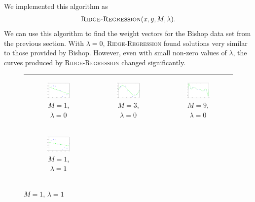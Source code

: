 \documentclass{sigchi}
\begin{document}
We implemented this algorithm as
\[\textsc{Ridge-Regression($x, y, M, \lambda$)}.\]
We can use this algorithm to find the weight vectors for the Bishop data set from the previous section. With $\lambda = 0$, \textsc{Ridge-Regression} found solutions very similar to those provided by Bishop. However, even with small non-zero values of $\lambda$, the curves produced by \textsc{Ridge-Regression} changed significantly.

\begin{figure}[!t]
\centering
\begin{tabular}{c c c}
\begin{subfigure}[b]{2.25in}
	\includegraphics[width = 2.25in]{3-1-0.png}
	\caption{$M = 1$, $\lambda = 0$}
\end{subfigure} &

\begin{subfigure}[b]{2.25in}
	\includegraphics[width = 2.25in]{3-3-0.png}
	\caption{$M = 3$, $\lambda = 0$}
\end{subfigure} &

\begin{subfigure}[b]{2.25in}
	\includegraphics[width = 2.25in]{3-9-0.png}
	\caption{$M = 9$, $\lambda = 0$}
\end{subfigure} \\


\begin{subfigure}[b]{2.25in}
	\includegraphics[width = 2.25in]{3-1-1.png}
	\caption{$M = 1$, $\lambda = 1$}
\end{subfigure} &


\end{tabular}
\end{figure}
\end{document}
